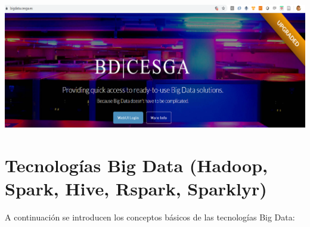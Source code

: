 \documentclass[]{book}
\begin{document}
\includegraphics{images/T3-bigdatacesga.png}

\hypertarget{tecnologias-big-data-hadoop-spark-hive-rspark-sparklyr}{%
\section{Tecnologías Big Data (Hadoop, Spark, Hive, Rspark, Sparklyr)}\label{tecnologias-big-data-hadoop-spark-hive-rspark-sparklyr}}

A continuación se introducen los conceptos básicos de las tecnologías Big Data:
\end{document}
